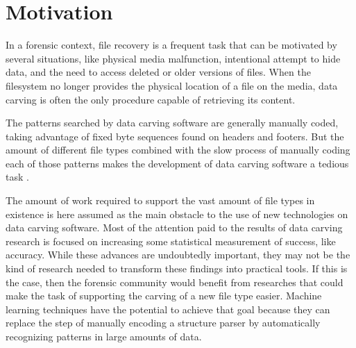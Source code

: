 \section{Motivation}
    
In a forensic context, file recovery is a frequent task that can be motivated by several situations, like physical media malfunction, intentional attempt to hide data, and the need to access deleted or older versions of files. When the filesystem no longer provides the physical location of a file on the media, data carving is often the only procedure capable of retrieving its content.


The patterns searched by data carving software are generally manually coded, taking advantage of fixed byte sequences found on headers and footers. But the amount of different file types combined with the slow process of manually coding each of those patterns makes the development of data carving software a tedious task \cite{mcdaniel_content_2003}.



The amount of work required to support the vast amount of file types in existence is here assumed as the main obstacle to the use of new technologies on data carving software. Most of the attention paid to the results of data carving research is focused on increasing some statistical measurement of success, like accuracy. While these advances are undoubtedly important, they may not be the kind of research needed to transform these findings into practical tools. If this is the case, then the forensic community would benefit from researches that could make the task of supporting the carving of a new file type easier. Machine learning techniques have the potential to achieve that goal because they can replace the step of manually encoding a structure parser by automatically recognizing patterns in large amounts of data.
